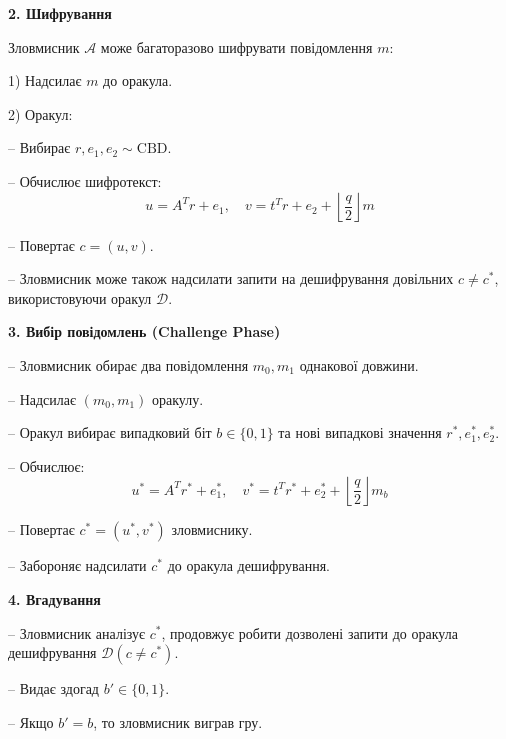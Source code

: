 \textbf{2. Шифрування}

Зловмисник $\mathcal{A}$ може багаторазово шифрувати повідомлення $m$:

1) Надсилає $m$ до оракула.

2) Оракул:

– Вибирає $r, e_1, e_2 \sim \text{CBD}$.

– Обчислює шифротекст:
\[
u = A^T r + e_1, \quad v = t^T r + e_2 + \left\lfloor \frac{q}{2} \right\rfloor m
\]

– Повертає $c = (u, v)$.

– Зловмисник може також надсилати запити на дешифрування довільних $c \ne c^*$, використовуючи оракул $\mathcal{D}$.

\textbf{3. Вибір повідомлень (Challenge Phase)}

– Зловмисник обирає два повідомлення $m_0, m_1$ однакової довжини.

– Надсилає $(m_0, m_1)$ оракулу.

– Оракул вибирає випадковий біт $b \in \{0,1\}$ та нові випадкові значення $r^*, e_1^*, e_2^*$.

– Обчислює:
\[
u^* = A^T r^* + e_1^*, \quad v^* = t^T r^* + e_2^* + \left\lfloor \frac{q}{2} \right\rfloor m_b
\]

– Повертає $c^* = (u^*, v^*)$ зловмиснику.

– Забороняє надсилати $c^*$ до оракула дешифрування.

\textbf{4. Вгадування}

– Зловмисник аналізує $c^*$, продовжує робити дозволені запити до оракула дешифрування $\mathcal{D}(c \ne c^*)$.

– Видає здогад $b' \in \{0, 1\}$.

– Якщо $b' = b$, то зловмисник виграв гру.


